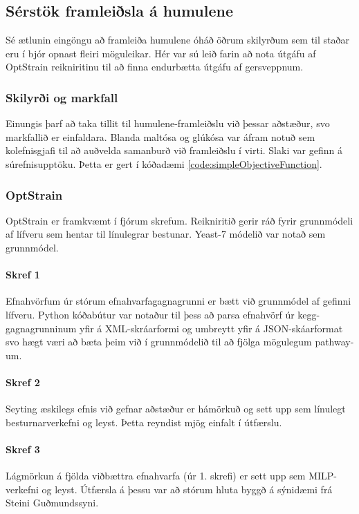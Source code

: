 \documentclass[11pt]{article}
\begin{document}
\begin{multicols}{2}
\subsection{Sérstök framleiðsla á humulene}
Sé ætlunin eingöngu að framleiða humulene óháð öðrum skilyrðum sem til staðar eru í bjór opnast fleiri möguleikar. Hér var sú leið farin að nota útgáfu af OptStrain reikniritinu \cite{pharkya2004optstrain} til að finna endurbætta útgáfu af gersveppnum.
\subsubsection{Skilyrði og markfall}
Einungis þarf að taka tillit til humulene-framleiðslu við þessar aðstæður, svo markfallið er einfaldara. Blanda maltósa og glúkósa var áfram notuð sem kolefnisgjafi til að auðvelda samanburð við framleiðslu í virti. Slaki var gefinn á súrefnisupptöku. Þetta er gert í kóðadæmi \ref{code:simpleObjectiveFunction}.
\subsubsection{OptStrain}
\label{sec:optstrain}
OptStrain er framkvæmt í fjórum skrefum. Reikniritið gerir ráð fyrir grunnmódeli af lífveru sem hentar til línulegrar bestunar. Yeast-7 módelið var notað sem grunnmódel.

\paragraph{Skref 1}
Efnahvörfum úr stórum efnahvarfagagnagrunni er bætt við grunnmódel af gefinni lífveru. Python kóðabútur var notaður til þess að parsa efnahvörf úr kegg-gagnagrunninum yfir á XML-skráarformi og umbreytt yfir á JSON-skáarformat svo hægt væri að bæta þeim við í grunnmódelið til að fjölga mögulegum pathway-um.

\paragraph{Skref 2}
Seyting æskilegs efnis við gefnar aðstæður er hámörkuð og sett upp sem línulegt besturnarverkefni og leyst. Þetta reyndist mjög einfalt í útfærslu.

\paragraph{Skref 3}
Lágmörkun á fjölda viðbættra efnahvarfa (úr 1. skrefi) er sett upp sem MILP-verkefni og leyst. Útfærsla á þessu var að stórum hluta byggð á sýnidæmi frá Steini Guðmundssyni.


\end{multicols}
\end{document}
